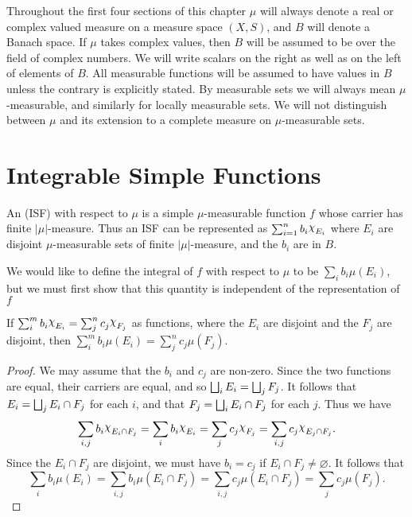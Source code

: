 

Throughout the first four sections of this chapter $\mu$ will always denote a real or complex valued measure on a measure space $(X,S)$, and $B$ will denote a Banach space. If $\mu$ takes complex values, then $B$ will be assumed to be over the field of complex numbers. We will write scalars on the right as well as on the left of elements of $B$. All measurable functions will be assumed to have values in $B$ unless the contrary is explicitly stated. By measurable sets we will always mean $\mu$-measurable, and similarly for locally measurable sets. We will not distinguish between $\mu$ and its extension to a complete measure on $\mu$-measurable sets.

\section{Integrable Simple Functions}

\begin{definition} 
An  (ISF) with respect to $\mu$ is a simple $\mu$-measurable function $f$ whose carrier has finite $|\mu|$-measure. Thus an ISF can be represented as $\sum_{i=1}^nb_i\idf{E_i}$ where $E_i$ are disjoint $\mu$-measurable sets of finite $|\mu|$-measure, and the $b_i$ are in $B$.
\end{definition}

We would like to define the integral of $f$ with respect to $\mu$ to be $\sum_ib_i\mu(E_i)$, but we must first show that this quantity is independent of the representation of $f$

\begin{lemma}
If $\sum_i^mb_i\idf{E_i}=\sum_j^nc_j\idf{F_j}$ as functions, where the $E_i$ are disjoint and the $F_j$ are disjoint, then $\sum_i^mb_i\mu(E_i)=\sum_j^nc_j\mu(F_j)$.
\end{lemma}

\begin{proof}
We may assume that the $b_i$ and $c_j$ are non-zero. Since the two functions are equal, their carriers are equal, and so $\bigsqcup_i E_i=\bigsqcup_j F_j$. It follows that $E_i=\bigsqcup_j E_i \cap F_j$ for each $i$, and that $F_j=\bigsqcup_iE_i \cap F_j$ for each $j$. Thus we have $$\sum_{i, j}b_i\idf{E_i \cap F_j}=\sum_i b_i\idf{E_i}=\sum_jc_j\idf{F_j}=\sum_{i, j} c_j\idf{E_j\cap F_j}.$$ Since the $E_i \cap F_j$ are disjoint, we must have $b_i=c_j$ if $E_i \cap F_j \neq \varnothing$. It follows that $$\sum_ib_i\mu(E_i)=\sum_{i,j}b_i\mu(E_i\cap F_j)=\sum_{i,j}c_j\mu(E_i\cap F_j)=\sum_jc_j\mu(F_j).$$
\end{proof}


